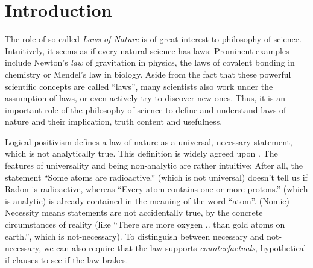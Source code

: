 \section*{Introduction}

The role of so-called \emph{Laws of Nature} is of great interest
to philosophy of science.
Intuitively, it seems as if every natural science has laws:
Prominent examples include Newton's \emph{law} of gravitation in physics,
the laws of covalent bonding in chemistry or Mendel's law in biology.
Aside from the fact that these powerful scientific concepts are called \enquote{laws},
many scientists also work under the assumption of laws, or
even actively try to discover new ones.
Thus, it is an important role of the philosophy of science to define and understand
laws of nature and their implication, truth content and usefulness.

Logical positivism defines a law of nature as a universal, necessary statement, which is not analytically true.
This definition is widely agreed upon \cite[57]{philsciencebook}.
The features of universality and being non-analytic are rather intuitive:
After all, the statement \enquote{Some atoms are radioactive.} (which is not universal) doesn't tell us if
Radon is radioactive, whereas \enquote{Every atom contains one or more protons.} (which is analytic)
is already contained in the meaning of the word \enquote{atom}.
(Nomic) Necessity means statements are not accidentally true,
by the concrete circumstances of reality (like \enquote{There are more oxygen .. than gold atoms on earth.}, which is not-necessary).
To distinguish between necessary and not-necessary, we can also require that
the law supports \emph{counterfactuals}, hypothetical if-clauses to see if the law brakes.